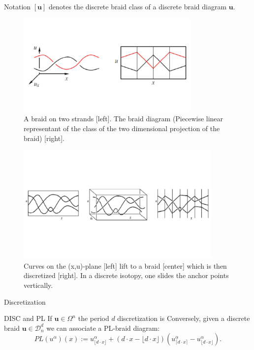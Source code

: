 \documentclass[9pt, english]{beamer}
\theoremstyle{definition}
\newcommand{\simbolovettore}[1]{{\boldsymbol{#1}}}
\newcommand{\vu}{\simbolovettore{u}}
\begin{document}
\begin{frame}
        \begin{block}{Notation}
            $[\vu]$ denotes the discrete braid class of a discrete braid
            diagram $\vu$.
        \end{block}
       \begin{figure}\label{fig:PLdiagram}
        \includegraphics[width=0.8\textwidth]{images/Fig19Wojcik2.pdf}\caption{A braid on two strands [left]. The braid diagram
        (Piecewise linear representant of the class of the two dimensional projection of the
        braid) [right].}
        \end{figure}
\end{frame}
\begin{frame}
        \begin{figure}\label{fig:fig1Inve}
        \includegraphics[width=0.9\textwidth]{images/Fig1Inventiones2.pdf}\caption{Curves on the (x,u)-plane [left] lift to a braid [center]
        which is then discretized [right]. In a discrete isotopy, one slides the anchor points vertically.}
        \end{figure}
\end{frame}
\begin{frame}{Discretization}
    \begin{block}{DISC and PL}
        If $\vu \in \Omega^n$ the period $d$ discretization is
        \structure{
        \[
        DISC_d(\vu):={u^\alpha(i/d)}_i^\alpha
        \]}\pause
        Conversely, given a discrete braid $\vu\in \mathscr D_n^d$ we
        can associate a PL-braid diagram:\pause
        \alert{
        \[
        PL(u^\alpha)(x):=u^\alpha_{\lfloor d\cdot x\rfloor}+ (d\cdot x-\lfloor d\cdot
        x\rfloor)(u^\alpha_{\lceil d\cdot x\rceil}-u^\alpha_{\lfloor d\cdot x\rfloor}).
        \]}
    \end{block}
\end{frame}
\end{document}
